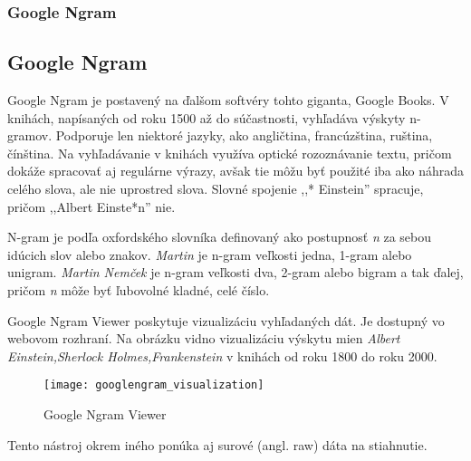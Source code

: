 %
%
{
	\subsubsection{Google Ngram}
}
{
	\subsection{Google Ngram}
}
\label{subsubsec:googlengram}
Google Ngram je postavený na ďalšom softvéry tohto giganta, Google Books. V knihách,  napísaných od roku 1500 až do súčastnosti, vyhľadáva výskyty n-gramov. Podporuje len niektoré jazyky, ako angličtina, francúzština, ruština, čínština. Na vyhľadávanie v knihách využíva optické rozoznávanie textu, pričom dokáže spracovať aj regulárne výrazy, avšak tie môžu byť použité iba ako náhrada celého slova, ale nie uprostred slova. Slovné spojenie ,,* Einstein'' spracuje, pričom ,,Albert Einste*n'' nie.

N-gram je podľa oxfordského slovníka definovaný ako postupnosť \textit{n} za sebou idúcich slov alebo znakov. \textit{Martin} je n-gram veľkosti jedna, 1-gram alebo unigram. \textit{Martin Nemček} je n-gram veľkosti dva, 2-gram alebo bigram a tak ďalej, pričom \textit{n} môže byť ľubovolné kladné, celé číslo.

Google Ngram Viewer poskytuje vizualizáciu vyhľadaných dát. Je dostupný vo webovom rozhraní. Na obrázku  vidno vizualizáciu výskytu mien \textit{Albert Einstein,Sherlock Holmes,Frankenstein} v knihách od roku 1800 do roku 2000.

\begin{figure}[H]
\begin{center}\texttt{[image: googlengram\_visualization]}\end{center}
\caption[Google Ngram Viewer]{Google Ngram Viewer}\label{fig:googlengram_visualization}
\end{figure}

Tento nástroj okrem iného ponúka aj surové (angl. raw) dáta na stiahnutie.

